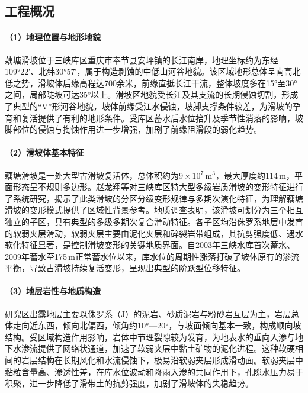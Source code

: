 \documentclass[12pt,a4paper]{article}
\begin{document}
\subsection{工程概况}

\paragraph{（1）地理位置与地形地貌}

藕塘滑坡位于三峡库区重庆市奉节县安坪镇的长江南岸，地理坐标约为东经109°22′、北纬30°57′，属于构造剥蚀的中低山河谷地貌。该区域地形总体呈南高北低之势，滑坡体后缘高程达700余米，前缘直抵长江干流，整体坡度多在15°至30°之间，局部陡坡可达35°以上。滑坡区地貌受长江及其支流的长期侵蚀切割，形成了典型的“V”形河谷地貌，坡体前缘受江水侵蚀，坡脚支撑条件较差，为滑坡的孕育和复活提供了有利的地形条件\cite{zhao2025reactivation}。受库区蓄水后水位抬升及季节性消落的影响，坡脚部位的侵蚀与掏蚀作用进一步增强，加剧了前缘阻滑段的弱化趋势。

\paragraph{（2）滑坡体基本特征}

藕塘滑坡是一处大型古滑坡复活体，总体积约为$9\times10^{7}$\,m$^{3}$，最大厚度约114\,m，平面形态呈不规则多边形\cite{huang2020deformation}。赵龙翔等\cite{zhao2022deformation}对三峡库区特大型多级岩质滑坡的变形特征进行了系统研究，揭示了此类滑坡的分区分级变形规律与多期次演化特征，为理解藕塘滑坡的变形模式提供了区域性背景参考。地质调查表明，该滑坡可划分为三个相互独立的子区，具有典型的多级多期次复合滑动特征。各子区均沿侏罗系地层中发育的软弱夹层滑动，软弱夹层主要由泥化夹层和碎裂岩带组成，其抗剪强度低、遇水软化特征显著，是控制滑坡变形的关键地质界面。自2003年三峡水库首次蓄水、2009年蓄水至175\,m正常蓄水位以来，库水位的周期性涨落打破了坡体原有的渗流平衡，导致古滑坡持续复活变形，呈现出典型的阶跃型位移特征。

\paragraph{（3）地层岩性与地质构造}

研究区出露地层主要以侏罗系（J）的泥岩、砂质泥岩与粉砂岩互层为主，岩层总体走向近东西，倾向北偏西，倾角约10°—20°，与坡面倾向基本一致，构成顺向坡结构。受区域构造作用影响，岩体中节理裂隙较为发育，为地表水的垂向入渗与地下水渗流提供了网络状通道，加速了软弱夹层中黏土矿物的泥化进程。这种软硬相间的岩层结构在长期风化和水流侵蚀下，极易沿软弱夹层形成滑动面。软弱夹层中黏粒含量高、渗透性差，在库水位波动和降雨入渗的共同作用下，孔隙水压力易于积聚，进一步降低了滑带土的抗剪强度，加剧了滑坡体的失稳趋势\cite{xiao2021outang}。
\end{document}
